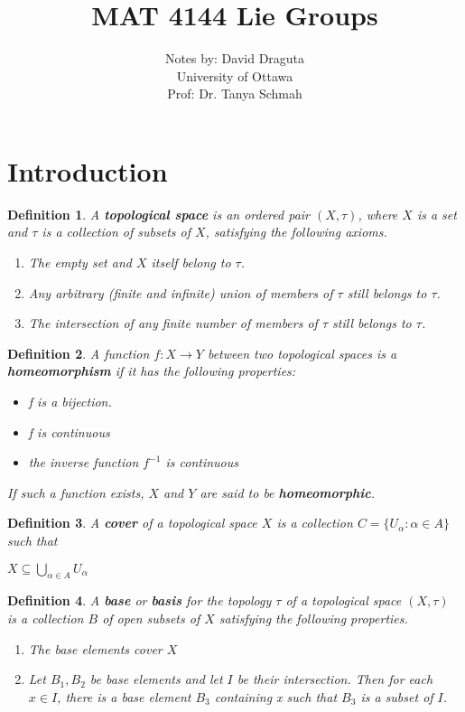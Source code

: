 \documentclass[12pt]{article}
\newcommand\inv[1]{#1^{-1}}
\newcommand\set[1]{\{#1\}}
\newtheorem{defn}{Definition}[thm]
\begin{document}
\date{}

 
\title{MAT 4144 Lie Groups}
\author{Notes by: David Draguta
  \\University of Ottawa\\ Prof: Dr. Tanya Schmah } 
 
\maketitle
\section{Introduction}

\begin{defn}
  A \textbf{topological space} is an ordered pair $(X, \tau)$, where $X$ is a set and $\tau$ is a collection of subsets of $X$, satisfying the following axioms.
  \begin{enumerate}
  \item The empty set and $X$ itself belong to $\tau$.
  \item Any arbitrary (finite and infinite) union of members of $\tau$ still belongs to $\tau$.
  \item The intersection of any finite number of members of $\tau$ still belongs to $\tau$.
  \end{enumerate}
\end{defn}

\begin{defn}
  A function $f: X \to Y$ between two topological spaces is a \textbf{homeomorphism} if it has the following properties:
  \begin{itemize}
  \item f is a bijection.
  \item f is continuous
  \item the inverse function $\inv{f}$ is continuous 
  \end{itemize}
  If such a function exists, $X$ and $Y$ are said to be \textbf{homeomorphic}.
\end{defn}

\begin{defn}
  A \textbf{cover} of a topological space $X$ is a collection $C = \set{U_{\alpha} : \alpha \in A}$ such that
  \begin{center}
    $X \subseteq \bigcup\limits_{\alpha \in A} U_{\alpha}$
  \end{center}
\end{defn}
\begin{defn}
  A \textbf{base} or \textbf{basis} for the topology $\tau$ of a topological space $(X,\tau)$ is a collection $B$ of open subsets of $X$ satisfying the following properties.
  \begin{enumerate}
  \item The base elements cover $X$
  \item Let $B_1, B_2$ be base elements and let $I$ be their intersection. Then for each $x \in I$, there is a base element $B_3$ containing x such that $B_3$ is a subset of $I$.
  \end{enumerate}
\end{defn}
\end{document}
